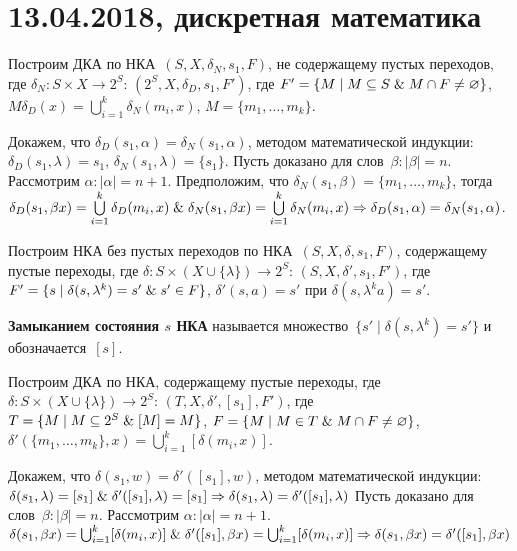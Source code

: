 \chapter{13.04.2018, дискретная математика}
Построим ДКА по НКА~$(S, X, \delta_N, s_1, F)$, не содержащему пустых переходов, где $\delta_N \colon S \times X \to 2^S$:
$(2^S, X, \delta_D, s_1, F')$, где
$F' = \{ M \mid M \subseteq S \mathrel{\&} M \cap F \neq \varnothing \}$,
$M \delta_D(x) = \bigcup\limits_{i=1}^k \delta_N(m_i, x)$,
$M = \{ m_1, \ldots, m_k \}$.

Докажем, что $\delta_D(s_1, \alpha) = \delta_N(s_1, \alpha)$, методом математической индукции:
	\indbase $\delta_D(s_1, \lambda) = s_1$, $\delta_N(s_1, \lambda) = \{ s_1 \}$.
	\indstep Пусть доказано для слов~$\beta \colon |\beta| = n$.
	Рассмотрим $\alpha \colon |\alpha| = n + 1$.
	Предположим, что $\delta_N(s_1, \beta) = \{ m_1, \ldots, m_k \}$, тогда $\delta_D(s_1, \beta x) = \bigcup\limits_{i=1}^k \delta_D(m_i, x) \mathrel{\&}
	\delta_N(s_1, \beta x) = \bigcup\limits_{i=1}^k \delta_N(m_i, x) \Rightarrow
	\delta_D(s_1, \alpha) = \delta_N(s_1, \alpha)$.
	\indend

Построим НКА без пустых переходов по НКА~$(S, X, \delta, s_1, F)$, содержащему пустые переходы, где $\delta \colon S \times (X \cup \{ \lambda \}) \to 2^S$:
$(S, X, \delta', s_1, F')$, где
$F' = \{ s \mid \delta(s, \lambda^k) = s' \mathrel{\&} s' \in F \}$,
$\delta'(s, a) = s'$ при $\delta(s, \lambda^k a) = s'$.

\textbf{Замыканием состояния $s$ НКА} называется множество~$\{ s' \mid \delta(s, \lambda^k) = s' \}$ и обозначается~$[s]$.

Построим ДКА по НКА, содержащему пустые переходы, где $\delta \colon S \times (X \cup \{ \lambda \}) \to 2^S$:
$(T, X, \delta', [s_1], F')$, где
$T = \{ M \mid M \subseteq 2^S \mathrel{\&} [M] = M \}$,
$F = \{ M \mid M \in T \mathrel{\&} M \cap F \neq \varnothing \}$,
$\delta'(\{ m_1, \ldots, m_k \}, x) = \bigcup\limits_{i=1}^k [\delta(m_i, x)]$.

Докажем, что $\delta(s_1, w) = \delta'([s_1], w)$, методом математической индукции:
	\indbase $\delta(s_1, \lambda) = [s_1] \mathrel{\&} \delta'([s_1], \lambda) = [s_1] \Rightarrow
	\delta(s_1, \lambda) = \delta'([s_1], \lambda)$
	\indstep Пусть доказано для слов~$\beta \colon |\beta| = n$.
	Рассмотрим $\alpha \colon |\alpha| = n + 1$.
	$\delta(s_1, \beta x) = \bigcup_{i=1}^k [\delta(m_i, x)] \mathrel{\&}
	\delta'([s_1], \beta x) = \bigcup_{i=1}^k [\delta(m_i, x)] \Rightarrow
	\delta(s_1, \beta x) = \delta'([s_1], \beta x)$
	\indend